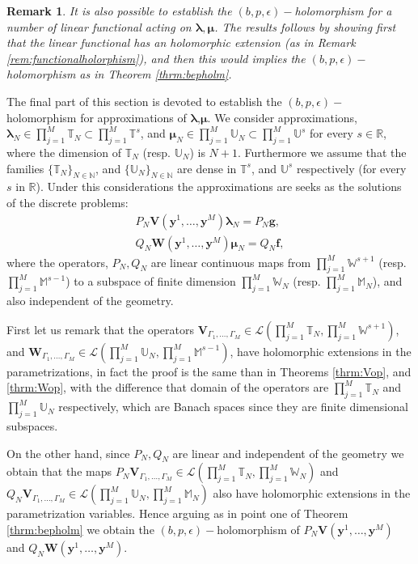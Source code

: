 \documentclass{article}
\newtheorem{remark}[theorem]{Remark}
\newcommand{\bmu} {\bm{\mu}}
\newcommand{\bg}{\bm{g}}
\newcommand{\IN}{{\mathbb N}}
\newcommand{\IM}{{\mathbb M}}
\newcommand{\IR}{{\mathbb R}}
\newcommand{\IU}{{\mathbb U}}
\newcommand{\IT}{{\mathbb T}}
\newcommand{\IW}{{\mathbb W}}
\newcommand{\bla}{\boldsymbol \lambda}
\newcommand{\by}{\bm{y}}
\begin{document}
\begin{remark}
It is also possible to establish the $(b,p,\epsilon)-$holomorphism for a number of   linear functional acting on $\bla, \bmu$. The results follows by showing first that the linear functional has an holomorphic extension (as in Remark \ref{rem:functionalholorphism}), and then this would implies the $(b,p,\epsilon)-$holomorphism as in Theorem \ref{thrm:bepholm}.
\end{remark}

The final part of this section is devoted to establish the $(b,p,\epsilon)-$holomorphism for approximations of $\bla$,$\bmu$. We consider approximations, $\bla_N \in \prod_{j=1}^M\IT_N  \subset \prod_{j=1}^M\IT^s$, and $\bmu_N \in \prod_{j=1}^M \IU_N \subset \prod_{j=1}^M \IU^s$ for every $s \in \IR$, where the dimension of $\IT_N$ (resp. $\IU_N$) is $N+1$. Furthermore we assume that the families $\{\IT_N\}_{N \in \IN}$, and $\{\IU_N\}_{N \in \IN}$ are dense in $\IT^s$, and $\IU^s$ respectively (for every $s$ in $\IR$). Under this considerations the approximations are seeks as the solutions of the discrete problems: 
\begin{align*}
P_N \mathbf{V}(\by^1,\hdots,\by^M) \bla_N = P_N \bg,\\
Q_N \mathbf{W}(\by^1,\hdots,\by^M) \bmu_N = Q_N \mathbf{f},
\end{align*}
where the operators, $P_N,Q_N$ are linear continuous maps from $\prod_{j=1}^M \IW^{s+1}$ (resp. $\prod_{j=1}^M \IM^{s-1}$) to a subspace of finite dimension $\prod_{j=1}^M \IW_N$ (resp. $\prod_{j=1}^M \IM_N$), and also independent of the geometry.

First let us remark that the operators $ \mathbf{V}_{\Gamma_1,\hdots,\Gamma_M} \in \mathcal{L}\left(  \prod_{j=1}^M\IT_N, \prod_{j=1}^M\IW^{s+1}\right)$, and $ \mathbf{W}_{\Gamma_1,\hdots,\Gamma_M} \in \mathcal{L}\left(  \prod_{j=1}^M\IU_N, \prod_{j=1}^M\IM^{s-1}\right)$, have holomorphic extensions in the parametrizations, in fact the proof is the same than in Theorems \ref{thrm:Vop}, and \ref{thrm:Wop}, with the difference that domain of the operators are $\prod_{j=1}^M\IT_N$ and $\prod_{j=1}^M\IU_N$ respectively, which are Banach spaces since they are finite dimensional subspaces.

On the other hand, since $P_N,Q_N$ are linear and independent of the geometry we obtain that the maps 
$P_N\mathbf{V}_{\Gamma_1,\hdots,\Gamma_M} \in \mathcal{L}\left(  \prod_{j=1}^M\IT_N, \prod_{j=1}^M\IW_N\right)$ and $Q_N\mathbf{V}_{\Gamma_1,\hdots,\Gamma_M} \in \mathcal{L}\left(  \prod_{j=1}^M\IU_N, \prod_{j=1}^M\IM_N\right)$ also have holomorphic extensions in the parametrization variables. Hence arguing as in point one of Theorem \ref{thrm:bepholm} we obtain the $(b,p,\epsilon)-$holomorphism of  $P_N\mathbf{V}(\by^1,\hdots,\by^M)$ and $Q_N\mathbf{W}(\by^1,\hdots,\by^M)$.
\end{document}
